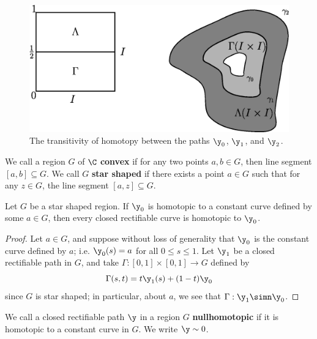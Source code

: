 \begin{figure}[h]
    \centering
    \includegraphics[scale=0.5]{Figures/chapter4/homotopy.eps}
    \caption{The transitivity of homotopy between the paths $\y_0$, $\y_1$, and
    $\y_2$.}
    \label{figure_4.3}
\end{figure}

\begin{definition}
    We call a region $G$ of  $\C$  \textbf{convex} if for any two points $a,b
    \in G$, then line segment  $[a,b] \subseteq G$. We call $G$  \textbf{star
    shaped} if there exists a point $a \in G$ such that for any  $z \in G$, the
    line segment $[a,z] \subseteq G$.
\end{definition}

\begin{lemma}\label{4.6.2}
    Let $G$ be a star shaped region. If  $\y_0$ is homotopic to a constant curve
    defined by some  $a \in G$, then every closed rectifiable curve is homotopic
    to  $\y_0$.
\end{lemma}
\begin{proof}
    Let $a \in G$, and suppose without loss of generality that  $\y_0$ is the
    constant curve defined by $a$; i.e.  $\y_0(s)=a$ for all $0 \leq s \leq 1$.
    Let  $\y_1$ be a closed rectifiable path in $G$, and take $\Gamma:[0,1]
    \times [0,1] \xrightarrow{} G$ defined by
    \begin{equation*}
        \Gamma(s,t)=t\y_1(s)+(1-t)\y_0
    \end{equation*}
    since $G$ is star shaped; in particular, about  $a$, we see that  $\Gamma:
    \y_1 \simn \y_0$.
\end{proof}

\begin{definition}
    We call a closed rectifiable path $\y$ in a region $G$
    \textbf{nullhomotopic} if it is homotopic to a constant curve in $G$. We
    write  $\y \sim 0$.
\end{definition}

